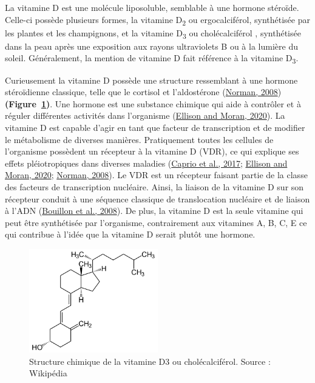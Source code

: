\documentclass[
  a4paper,
  DIV=11,
  numbers=noendperiod,
  listof=totoc]{scrreprt}
\begin{document}
La vitamine D est une molécule liposoluble, semblable à une hormone
stéroïde. Celle-ci possède plusieurs formes, la vitamine
D\textsubscript{2} ou ergocalciférol, synthétisée par les plantes et les
champignons, et la vitamine D\textsubscript{3} ou cholécalciférol ,
synthétisée dans la peau après une exposition aux rayons ultraviolets B
ou à la lumière du soleil. Généralement, la mention de vitamine D fait
référence à la vitamine D\textsubscript{3}.

Curieusement la vitamine D possède une structure ressemblant à une
hormone stéroïdienne classique, telle que le cortisol et l'aldostérone
(\protect\hyperlink{ref-Norman.2008}{Norman, 2008})
\textbf{(Figure~\ref{fig-vitd3})}. Une hormone est une substance
chimique qui aide à contrôler et à réguler différentes activités dans
l'organisme (\protect\hyperlink{ref-Ellison.2020}{Ellison and Moran,
2020}). La vitamine D est capable d'agir en tant que facteur de
transcription et de modifier le métabolisme de diverses manières.
Pratiquement toutes les cellules de l'organisme possèdent un récepteur à
la vitamine D (VDR), ce qui explique ses effets pléiotropiques dans
diverses maladies (\protect\hyperlink{ref-Caprio.2017}{Caprio et al.,
2017}; \protect\hyperlink{ref-Ellison.2020}{Ellison and Moran, 2020};
\protect\hyperlink{ref-Norman.2008}{Norman, 2008}). Le VDR est un
récepteur faisant partie de la classe des facteurs de transcription
nucléaire. Ainsi, la liaison de la vitamine D sur son récepteur conduit
à une séquence classique de translocation nucléaire et de liaison à
l'ADN (\protect\hyperlink{ref-Bouillon.2008}{Bouillon et al., 2008}). De
plus, la vitamine D est la seule vitamine qui peut être synthétisée par
l'organisme, contrairement aux vitamines A, B, C, E ce qui contribue à
l'idée que la vitamine D serait plutôt une hormone.

\begin{figure}

{\centering \includegraphics[width=0.5\textwidth,height=\textheight]{figures/vitamin-d3.png}

}

\caption{\label{fig-vitd3}Structure chimique de la vitamine D3 ou
cholécalciférol. Source : Wikipédia}

\end{figure}
\end{document}
